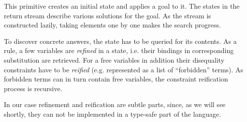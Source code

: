 This primitive creates an initial state and applies a goal to it. The states in the return stream describe
various solutions for the goal. As the stream is constructed lazily, taking elements one by one makes
the search progress. 

To discover concrete answers, the state has to be queried for its contents. As a rule, a few variables
are \emph{refined} in a state, i.e. their bindings in corresponding substitution are retrieved. For a free
variables in addition their disequality constraints have to be \emph{reified} (e.g. represented as a list of
``forbidden'' terms). As forbidden terms can in turn contain free variables, the constraint reification
process is recursive.

In our case refinement and reification are subtle parts, since, as we will see shortly, they can not be
implemented in a type-safe part of the language. 

